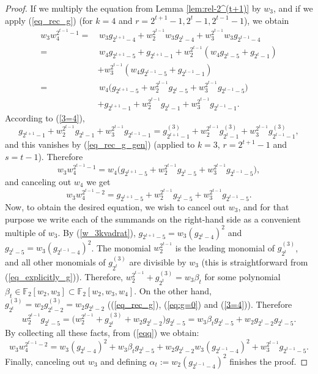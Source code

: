 \documentclass[10pt,a4paper]{amsart}
\newcommand{\F}{\mathbb F}
\begin{document}
\begin{proof}
If we multiply the equation from Lemma \ref{lem:rel-2^(t+1)} by $w_3$, and if we apply (\ref{eq_rec_g}) (for $k=4$ and $r = 2^{t+1}-1, 2^t-1, 2^{t-1} -1$), we obtain
\begin{align*}
  w_3w_4^{2^{t-1}-1}=& \,w_3g_{2^{t+1}-4}+w_2^{2^{t-1}}w_3g_{2^t-4} + w_3^{2^{t-1}}w_3g_{2^{t-1}-4}\\
  =&\,w_4g_{2^{t+1}-5}+g_{2^{t+1}-1}+w_2^{2^{t-1}}(w_4g_{2^t-5}+g_{2^t-1}) \\
  &+ w_3^{2^{t-1}}(w_4g_{2^{t-1}-5}+g_{2^{t-1}-1})\\
  =&\,w_4\big(g_{2^{t+1}-5}+w_2^{2^{t-1}}g_{2^t-5} + w_3^{2^{t-1}}g_{2^{t-1}-5}\big)\\
  &+g_{2^{t+1}-1}+w_2^{2^{t-1}}g_{2^t-1} + w_3^{2^{t-1}}g_{2^{t-1}-1}.
  \end{align*}
  According to (\ref{3=4}), 
  \[g_{2^{t+1}-1}+w_2^{2^{t-1}}g_{2^t-1} + w_3^{2^{t-1}}g_{2^{t-1}-1}=g_{2^{t+1}-1}^{(3)}+w_2^{2^{t-1}}g_{2^t-1}^{(3)} + w_3^{2^{t-1}}g_{2^{t-1}-1}^{(3)},\] 
  and this vanishes by (\ref{eq_rec_g_gen}) (applied to $k=3$, $r=2^{t+1}-1$ and $s=t-1$). Therefore
  \[w_3w_4^{2^{t-1}-1}=w_4\big(g_{2^{t+1}-5}+w_2^{2^{t-1}}g_{2^t-5} + w_3^{2^{t-1}}g_{2^{t-1}-5}\big),\]
  and canceling out $w_4$ we get
  \begin{equation}\label{eqq}
     w_3w_4^{2^{t-1}-2}=g_{2^{t+1}-5}+w_2^{2^{t-1}}g_{2^t-5} + w_3^{2^{t-1}}g_{2^{t-1}-5}. 
  \end{equation}
Now, to obtain the desired equation, we wish to cancel out $w_3$, and for that purpose we write each of the summands on the right-hand side as a convenient multiple of $w_3$.
By (\ref{w_3kvadrat}), $g_{2^{t+1}-5}=w_3(g_{2^t-4})^2$ and $g_{2^t-5}=w_3(g_{2^{t-1}-4})^2$. The monomial $w_2^{2^{t-1}}$ is the leading monomial of $g_{2^t}^{(3)}$, and all other monomials of $g_{2^t}^{(3)}$ are divisible by $w_3$ (this is straightforward from (\ref{eq_explicitly_g})). Therefore, $w_2^{2^{t-1}}+g_{2^t}^{(3)}=w_3\beta_t$ for some polynomial $\beta_t\in\F_2[w_2,w_3]\subset\F_2[w_2,w_3,w_4]$. On the other hand, $g_{2^t}^{(3)}=w_2g_{2^t-2}^{(3)}=w_2g_{2^t-2}$ ((\ref{eq_rec_g}), (\ref{eq:g=0}) and (\ref{3=4})). Therefore
\[w_2^{2^{t-1}}g_{2^t-5}=\big(w_2^{2^{t-1}}+g_{2^t}^{(3)}+w_2g_{2^t-2}\big)g_{2^t-5}=w_3\beta_tg_{2^t-5}+w_2g_{2^t-2}g_{2^t-5}.\]
By collecting all these facts, from (\ref{eqq}) we obtain:
\[w_3w_4^{2^{t-1}-2}=w_3(g_{2^t-4})^2+w_3\beta_tg_{2^t-5}+w_2g_{2^t-2}w_3(g_{2^{t-1}-4})^2 + w_3^{2^{t-1}}g_{2^{t-1}-5}.\]
Finally, canceling out $w_3$ and defining $\alpha_t:=w_2(g_{2^{t-1}-4})^2$ finishes the proof.
\end{proof}
\end{document}
